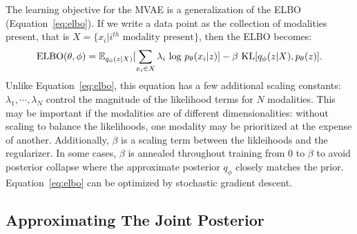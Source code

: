 The learning objective for the MVAE is a generalization of the ELBO (Equation~\ref{eq:elbo}). If we write a data point as the collection of modalities present, that is $X = \{x_i | \text{$i^{th}$ modality present}\}$, then the ELBO becomes:
\begin{equation}
\label{eq:mmelbo}
    \textup{ELBO}(\theta, \phi) = \mathbb{E}_{q_{\phi}(z|X)}[\sum_{x_i \in X} \lambda_{i} \textup{ log }p_{\theta}(x_{i}|z)] - \beta \textup{ KL}[q_{\phi}(z|X), p_\theta(z)].
\end{equation}
Unlike Equation~\ref{eq:elbo}, this equation has a few additional scaling constants: $\lambda_1, \cdots, \lambda_N$ control the magnitude of the likelihood terms for $N$ modalities. This may be important if the modalities are of different dimensionalities: without scaling to balance the likelihoods, one modality may be prioritized at the expense of another. Additionally, $\beta$ is a scaling term between the likleihoods and the regularizer. In some cases, $\beta$ is annealed throughout training from $0$ to $\beta$ \cite{higgins2016beta} to avoid posterior collapse where the approximate posterior $q_\phi$ closely matches the prior. Equation~\ref{eq:elbo} can be optimized by stochastic gradient descent.

\subsection{Approximating The Joint Posterior}

